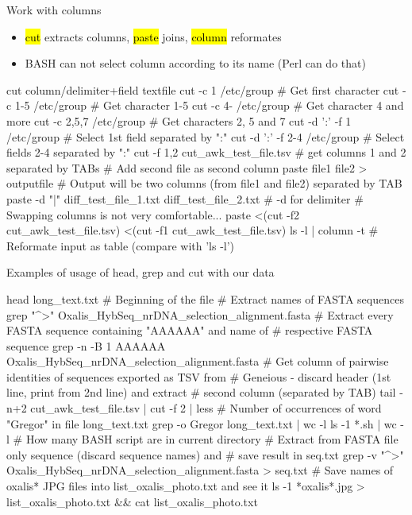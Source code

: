 \documentclass[compress, ucs, xelatex, 11pt, xcolor=svgnames,
  hyperref={
    bookmarks=true,
    unicode=true,
    colorlinks=true,
    pdftitle={Linux, command line and MetaCentrum},
    plainpages=false,
    pdfauthor={Vojtech Zeisek},
    pdfsubject={Course about use of Linux command line, writing shell scripts and using MetaCentrum of CESNET},
    pdfcreator={XeLaTeX},
    pdfkeywords={Linux, GNU, BASH, shell, command line, MetaCentrum},
    linkcolor=DarkRed,
    anchorcolor=DarkBlue,
    citecolor=Indigo,
    filecolor=NavyBlue,
    menucolor=DarkMagenta,
    urlcolor=DarkBlue,
    pdftex},
  url={hyphens, lowtilde} %
  ]{beamer}
\renewcommand{\texttt}[1]{\hl{\ttfamily #1}}
\begin{document}
\begin{frame}[fragile]{Work with columns}
  \label{cutpaste}
  \begin{itemize}
    \item \texttt{cut} extracts columns, \texttt{paste} joins, \texttt{column} reformates
    \item BASH can not select column according to its name (Perl can do that)
  \end{itemize}
  \begin{bashcode}
    cut column/delimiter+field textfile
    cut -c 1 /etc/group # Get first character
    cut -c 1-5 /etc/group # Get character 1-5
    cut -c 4- /etc/group # Get character 4 and more
    cut -c 2,5,7 /etc/group # Get characters 2, 5 and 7
    cut -d ':' -f 1 /etc/group # Select 1st field separated by ":"
    cut -d ':' -f 2-4 /etc/group # Select fields 2-4 separated by ":"
    cut -f 1,2 cut_awk_test_file.tsv # get columns 1 and 2 separated by TABs
    # Add second file as second column
    paste file1 file2 > outputfile
    # Output will be two columns (from file1 and file2) separated by TAB
    paste -d "|" diff_test_file_1.txt diff_test_file_2.txt # -d for delimiter
    # Swapping columns is not very comfortable...
    paste <(cut -f2 cut_awk_test_file.tsv) <(cut -f1 cut_awk_test_file.tsv)
    ls -l | column -t # Reformate input as table (compare with 'ls -l')
  \end{bashcode}
  \vfill
\end{frame}

\begin{frame}[fragile]{Examples of usage of head, grep and cut with our data}
  \begin{bashcode}
    head long_text.txt # Beginning of the file
    # Extract names of FASTA sequences
    grep "^>" Oxalis_HybSeq_nrDNA_selection_alignment.fasta
    # Extract every FASTA sequence containing "AAAAAA" and name of
    # respective FASTA sequence
    grep -n -B 1 AAAAAA Oxalis_HybSeq_nrDNA_selection_alignment.fasta
    # Get column of pairwise identities of sequences exported as TSV from
    # Geneious - discard header (1st line, print from 2nd line) and extract
    # second column (separated by TAB)
    tail -n+2 cut_awk_test_file.tsv | cut -f 2 | less
    # Number of occurrences of word "Gregor" in file long_text.txt
    grep -o Gregor long_text.txt | wc -l
    ls -1 *.sh | wc -l # How many BASH script are in current directory
    # Extract from FASTA file only sequence (discard sequence names) and
    # save result in seq.txt
    grep -v "^>" Oxalis_HybSeq_nrDNA_selection_alignment.fasta > seq.txt
    # Save names of oxalis* JPG files into list_oxalis_photo.txt and see it
    ls -1 *oxalis*.jpg > list_oxalis_photo.txt && cat list_oxalis_photo.txt
  \end{bashcode}
\end{frame}
\end{document}
